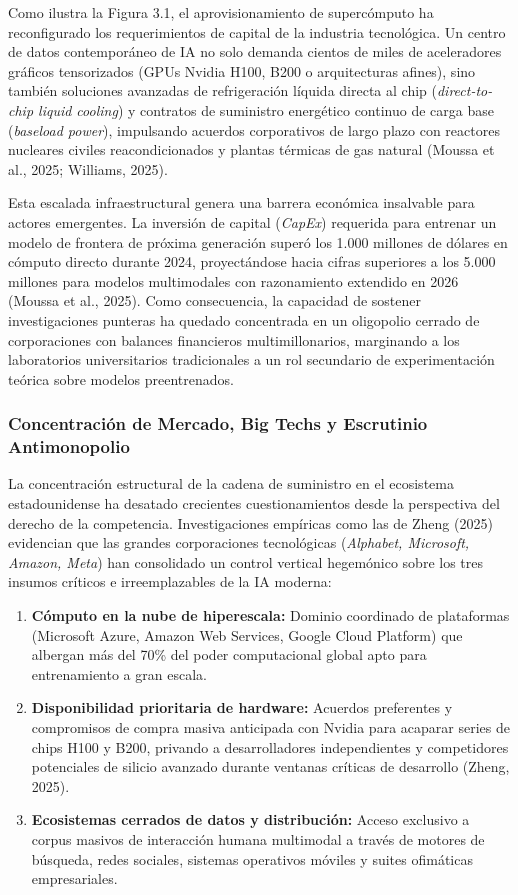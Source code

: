 Como ilustra la Figura 3.1, el aprovisionamiento de supercómputo ha reconfigurado los requerimientos de capital de la industria tecnológica. Un centro de datos contemporáneo de IA no solo demanda cientos de miles de aceleradores gráficos tensorizados (GPUs Nvidia H100, B200 o arquitecturas afines), sino también soluciones avanzadas de refrigeración líquida directa al chip (\textit{direct-to-chip liquid cooling}) y contratos de suministro energético continuo de carga base (\textit{baseload power}), impulsando acuerdos corporativos de largo plazo con reactores nucleares civiles reacondicionados y plantas térmicas de gas natural (Moussa et al., 2025; Williams, 2025). 

Esta escalada infraestructural genera una barrera económica insalvable para actores emergentes. La inversión de capital (\textit{CapEx}) requerida para entrenar un modelo de frontera de próxima generación superó los 1.000 millones de dólares en cómputo directo durante 2024, proyectándose hacia cifras superiores a los 5.000 millones para modelos multimodales con razonamiento extendido en 2026 (Moussa et al., 2025). Como consecuencia, la capacidad de sostener investigaciones punteras ha quedado concentrada en un oligopolio cerrado de corporaciones con balances financieros multimillonarios, marginando a los laboratorios universitarios tradicionales a un rol secundario de experimentación teórica sobre modelos preentrenados.

\subsubsection{Concentración de Mercado, Big Techs y Escrutinio Antimonopolio}

La concentración estructural de la cadena de suministro en el ecosistema estadounidense ha desatado crecientes cuestionamientos desde la perspectiva del derecho de la competencia. Investigaciones empíricas como las de Zheng (2025) evidencian que las grandes corporaciones tecnológicas (\textit{Alphabet, Microsoft, Amazon, Meta}) han consolidado un control vertical hegemónico sobre los tres insumos críticos e irreemplazables de la IA moderna:
\begin{enumerate}[label=\alph*), leftmargin=2em]
    \item \textbf{Cómputo en la nube de hiperescala:} Dominio coordinado de plataformas (Microsoft Azure, Amazon Web Services, Google Cloud Platform) que albergan más del 70\% del poder computacional global apto para entrenamiento a gran escala.
    \item \textbf{Disponibilidad prioritaria de hardware:} Acuerdos preferentes y compromisos de compra masiva anticipada con Nvidia para acaparar series de chips H100 y B200, privando a desarrolladores independientes y competidores potenciales de silicio avanzado durante ventanas críticas de desarrollo (Zheng, 2025).
    \item \textbf{Ecosistemas cerrados de datos y distribución:} Acceso exclusivo a corpus masivos de interacción humana multimodal a través de motores de búsqueda, redes sociales, sistemas operativos móviles y suites ofimáticas empresariales.
\end{enumerate}

